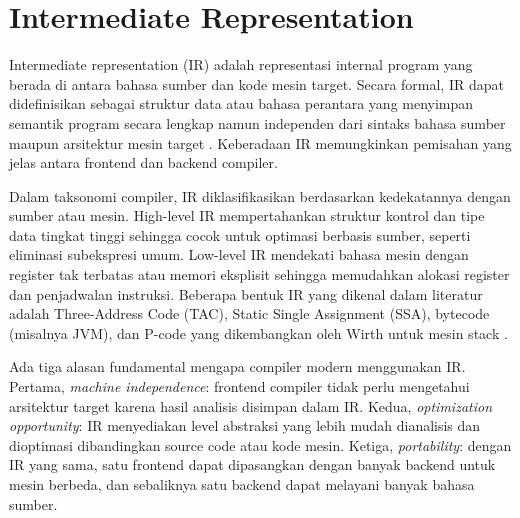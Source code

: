 \section{Intermediate Representation}

Intermediate representation (IR) adalah representasi internal program yang berada di antara bahasa sumber dan kode mesin target. Secara formal, IR dapat didefinisikan sebagai struktur data atau bahasa perantara yang menyimpan semantik program secara lengkap namun independen dari sintaks bahasa sumber maupun arsitektur mesin target \cite{aho2007compilers,cooper2011engineering}. Keberadaan IR memungkinkan pemisahan yang jelas antara frontend dan backend compiler.

Dalam taksonomi compiler, IR diklasifikasikan berdasarkan kedekatannya dengan sumber atau mesin. High-level IR mempertahankan struktur kontrol dan tipe data tingkat tinggi sehingga cocok untuk optimasi berbasis sumber, seperti eliminasi subekspresi umum. Low-level IR mendekati bahasa mesin dengan register tak terbatas atau memori eksplisit sehingga memudahkan alokasi register dan penjadwalan instruksi. Beberapa bentuk IR yang dikenal dalam literatur adalah Three-Address Code (TAC), Static Single Assignment (SSA), bytecode (misalnya JVM), dan P-code yang dikembangkan oleh Wirth untuk mesin stack \cite{appel1998modern,wirth1976algorithms}.

Ada tiga alasan fundamental mengapa compiler modern menggunakan IR. Pertama, \textit{machine independence}: frontend compiler tidak perlu mengetahui arsitektur target karena hasil analisis disimpan dalam IR. Kedua, \textit{optimization opportunity}: IR menyediakan level abstraksi yang lebih mudah dianalisis dan dioptimasi dibandingkan source code atau kode mesin. Ketiga, \textit{portability}: dengan IR yang sama, satu frontend dapat dipasangkan dengan banyak backend untuk mesin berbeda, dan sebaliknya satu backend dapat melayani banyak bahasa sumber.

